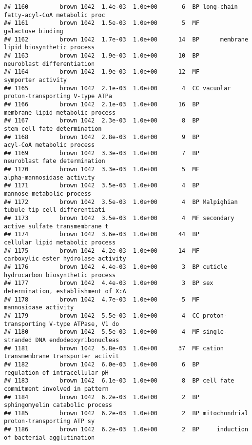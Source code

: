 \documentclass[]{article}
\begin{document}
\begin{verbatim}
## 1160         brown 1042  1.4e-03  1.0e+00       6  BP long-chain fatty-acyl-CoA metabolic proc
## 1161         brown 1042  1.5e-03  1.0e+00       5  MF                        galactose binding
## 1162         brown 1042  1.7e-03  1.0e+00      14  BP      membrane lipid biosynthetic process
## 1163         brown 1042  1.9e-03  1.0e+00      10  BP               neuroblast differentiation
## 1164         brown 1042  1.9e-03  1.0e+00      12  MF                       symporter activity
## 1165         brown 1042  2.1e-03  1.0e+00       4  CC vacuolar proton-transporting V-type ATPa
## 1166         brown 1042  2.1e-03  1.0e+00      16  BP         membrane lipid metabolic process
## 1167         brown 1042  2.3e-03  1.0e+00       8  BP             stem cell fate determination
## 1168         brown 1042  2.8e-03  1.0e+00       9  BP               acyl-CoA metabolic process
## 1169         brown 1042  3.3e-03  1.0e+00       7  BP            neuroblast fate determination
## 1170         brown 1042  3.3e-03  1.0e+00       5  MF               alpha-mannosidase activity
## 1171         brown 1042  3.5e-03  1.0e+00       4  BP                mannose metabolic process
## 1172         brown 1042  3.5e-03  1.0e+00       4  BP Malpighian tubule tip cell differentiati
## 1173         brown 1042  3.5e-03  1.0e+00       4  MF secondary active sulfate transmembrane t
## 1174         brown 1042  3.6e-03  1.0e+00      44  BP         cellular lipid metabolic process
## 1175         brown 1042  4.2e-03  1.0e+00      14  MF      carboxylic ester hydrolase activity
## 1176         brown 1042  4.4e-03  1.0e+00       3  BP cuticle hydrocarbon biosynthetic process
## 1177         brown 1042  4.4e-03  1.0e+00       3  BP sex determination, establishment of X:A 
## 1178         brown 1042  4.7e-03  1.0e+00       5  MF                     mannosidase activity
## 1179         brown 1042  5.5e-03  1.0e+00       4  CC proton-transporting V-type ATPase, V1 do
## 1180         brown 1042  5.5e-03  1.0e+00       4  MF single-stranded DNA endodeoxyribonucleas
## 1181         brown 1042  5.8e-03  1.0e+00      37  MF cation transmembrane transporter activit
## 1182         brown 1042  6.0e-03  1.0e+00       6  BP           regulation of intracellular pH
## 1183         brown 1042  6.1e-03  1.0e+00       8  BP cell fate commitment involved in pattern
## 1184         brown 1042  6.2e-03  1.0e+00       2  BP          sphingomyelin catabolic process
## 1185         brown 1042  6.2e-03  1.0e+00       2  BP mitochondrial proton-transporting ATP sy
## 1186         brown 1042  6.2e-03  1.0e+00       2  BP     induction of bacterial agglutination

\end{verbatim}
\end{document}
